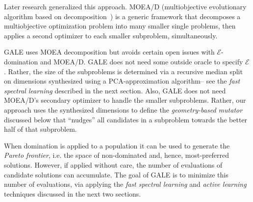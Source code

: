 \documentclass[10pt,journal,compsoc]{IEEEtran}
\newcommand{\tion}[1]{\textsection\ref{sec:#1}}
\newenvironment{changed}{\par\color{MyDarkBlue}}{\par}
\begin{document}
\begin{changed}
Later research generalized this approach.
MOEA/D (multiobjective
evolutionary algorithm based on
decomposition~\cite{zhang07}) is a generic framework
that decomposes a multiobjective optimization
problem into many smaller single problems, then
applies a second optimizer to each smaller subproblem,
simultaneously. 

GALE uses MOEA decomposition but avoids certain 
open issues with   $\mathcal{E}$-domination and MOEA/D. 
GALE does not need some outside oracle to specify
$\mathcal{E}$. Rather, the size of the subproblems is determined
via a recursive median split
on dimensions synthesized
using a PCA-approximation algorithm-- see the  {\em fast spectral learning}
described in the next section. Also, GALE does not need MOEA/D's secondary optimizer to handle 
the smaller subproblems. Rather, our approach uses  the synthesized dimensions
to define the {\em geometry-based mutator}
discussed below
that ``nudges'' all candidates in a subproblem towards the better half of that subproblem. 

\end{changed}



When domination is applied to a
population it can be used to generate the {\em
  Pareto frontier}, i.e.  the space of non-dominated
and, hence, most-preferred solutions.  However, if applied without care,
the number of evaluations of candidate solutions can accumulate.  The goal of GALE
is to minimize this number of evaluations, via applying the {\em fast spectral learning}
and {\em active learning} techniques discussed in the next two sections.





\end{document}
